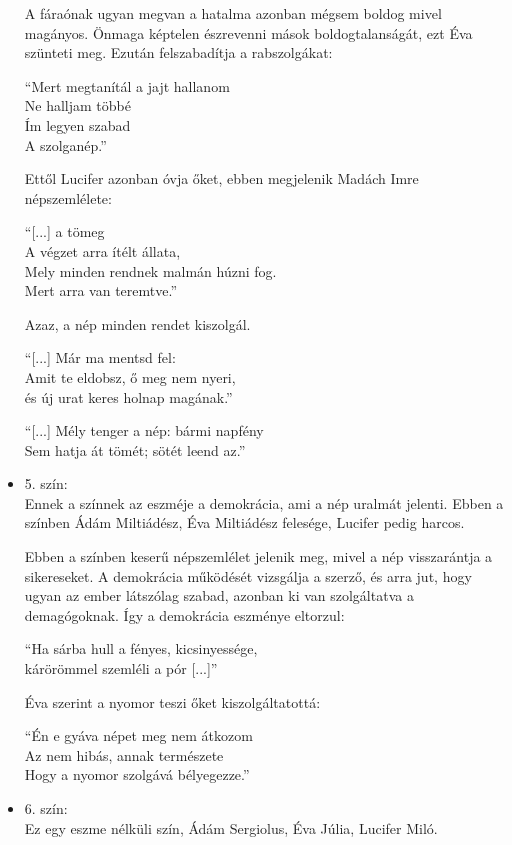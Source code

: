 \documentclass[]{article}
\begin{document}
\begin{itemize}
			A fáraónak ugyan megvan a hatalma azonban mégsem boldog mivel magányos. Önmaga képtelen észrevenni mások boldogtalanságát, ezt Éva szünteti meg. Ezután felszabadítja a rabszolgákat:
			\begin{displayquote}
				\enquote{Mert megtanítál a jajt hallanom\\
				Ne halljam többé\\
				Ím legyen szabad\\
				A szolganép.}
			\end{displayquote}
			Ettől Lucifer azonban óvja őket, ebben megjelenik Madách Imre népszemlélete:
			\begin{displayquote}
				\enquote{[...] a tömeg\\
				A végzet arra ítélt állata,\\
				Mely minden rendnek malmán húzni fog.\\
				Mert arra van teremtve.}
			\end{displayquote}
			Azaz, a nép minden rendet kiszolgál.
			\begin{displayquote}
				\enquote{[...] Már ma mentsd fel:\\
				Amit te eldobsz, ő meg nem nyeri,\\
				és új urat keres holnap magának.}
			\end{displayquote}
			\begin{displayquote}
				\enquote{[...] Mély tenger a nép: bármi napfény\\
				Sem hatja át tömét; sötét leend az.}
			\end{displayquote}
		\item 5. szín:\\
			Ennek a színnek az eszméje a demokrácia, ami a nép uralmát jelenti. Ebben a színben Ádám Miltiádész, Éva Miltiádész felesége, Lucifer pedig harcos.
			
			Ebben a színben keserű népszemlélet jelenik meg, mivel a nép visszarántja a sikereseket. A demokrácia működését vizsgálja a szerző, és arra jut, hogy ugyan az ember látszólag szabad, azonban ki van szolgáltatva a demagógoknak. Így a demokrácia eszménye eltorzul:
			\begin{displayquote}
				\enquote{Ha sárba hull a fényes, kicsinyessége,\\
					kárörömmel szemléli a pór [...]}
			\end{displayquote}
		 	Éva szerint a nyomor teszi őket kiszolgáltatottá:
		 	\begin{displayquote}
		 		\enquote{Én e gyáva népet meg nem átkozom\\
		 		Az nem hibás, annak természete\\
	 			Hogy a nyomor szolgává bélyegezze.}
		 	\end{displayquote}
	 	\item 6. szín:\\
	 		Ez egy eszme nélküli szín, Ádám Sergiolus, Éva Júlia, Lucifer Miló.
	 		

\end{itemize}
\end{document}
